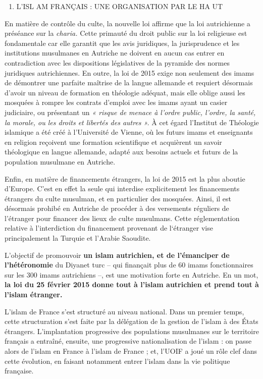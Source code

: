 \begin{enumerate}
\def\labelenumi{\Roman{enumi}.}
\setcounter{enumi}{1}
\item
  L'ISL AM FRANÇAIS : UNE ORGANISATION PAR LE HA UT
\end{enumerate}


En matière de contrôle du culte, la nouvelle loi affirme que la loi
autrichienne a préséance sur la \emph{charia.} Cette primauté du droit
public sur la loi religieuse est fondamentale car elle garantit que les
avis juridiques, la jurisprudence et les institutions musulmanes en
Autriche ne doivent en aucun cas entrer en contradiction avec les
dispositions législatives de la pyramide des normes juridiques
autrichiennes. En outre, la loi de 2015 exige non seulement des imams de
démontrer une parfaite maîtrise de la langue allemande et requiert
désormais d'avoir un niveau de formation en théologie adéquat, mais elle
oblige aussi les mosquées à rompre les contrats d'emploi avec les imams
ayant un casier judiciaire, ou présentant un \emph{« risque de menace à
l'ordre public, l'ordre, la santé, la morale, ou les droits et libertés
des autres ».} À cet égard l'Institut de Théologie islamique a été créé
à l'Université de Vienne, où les futurs imams et enseignants en religion
reçoivent une formation scientifique et acquièrent un savoir théologique
en langue allemande, adapté aux besoins actuels et futurs de la
population musulmane en Autriche.

Enfin, en matière de financements étrangers, la loi de 2015 est la plus
aboutie d'Europe. C'est en effet la seule qui interdise explicitement
les financements étrangers du culte musulman, et en particulier des
mosquées. Ainsi, il est désormais prohibé en Autriche de procéder à des
versements réguliers de l'étranger pour financer des lieux de culte
musulmans. Cette réglementation relative à l'interdiction du financement
provenant de l`étranger vise principalement la Turquie et l'Arabie
Saoudite.

L'objectif de promouvoir \textbf{un islam autrichien, et de l'émanciper
de l'hétéronomie} du Diyanet turc -- qui finançait plus de 60 imams
fonctionnaires sur les 300 imams autrichiens --, est une motivation
forte en Autriche. En un mot, \textbf{la loi du 25 février 2015 donne
tout à l'islam autrichien et prend tout à l'islam étranger.}

L'islam de France s'est structuré au niveau national. Dans un premier
temps, cette structuration s'est faite par la délégation de la gestion
de l'islam à des États étrangers. L'implantation progressive des
populations musulmanes sur le territoire français a entraîné, ensuite,
une progressive nationalisation de l'islam : on passe alors de l'islam
en France à l'islam de France ; et, l'UOIF a joué un rôle clef dans
cette évolution, en faisant notamment entrer l'islam dans la vie
politique française.



